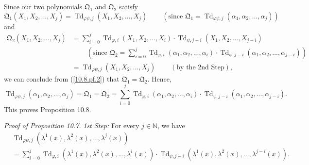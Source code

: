 \documentclass[numbers=enddot,12pt,final,onecolumn,notitlepage]{scrartcl}%
\begin{document}
Since our two polynomials $\mathfrak{Q}_{1}$ and $\mathfrak{Q}_{2}$ satisfy%
\[
\mathfrak{Q}_{1}\left(  X_{1},X_{2},...,X_{j}\right)  =\operatorname*{Td}%
\nolimits_{\varphi\psi,j}\left(  X_{1},X_{2},...,X_{j}\right)
\ \ \ \ \ \ \ \ \ \ \left(  \text{since }\mathfrak{Q}_{1}=\operatorname*{Td}%
\nolimits_{\varphi\psi,j}\left(  \alpha_{1},\alpha_{2},...,\alpha_{j}\right)
\right)
\]
and%
\begin{align*}
\mathfrak{Q}_{2}\left(  X_{1},X_{2},...,X_{j}\right)   &  =\sum_{i=0}%
^{j}\operatorname*{Td}\nolimits_{\varphi,i}\left(  X_{1},X_{2},...,X_{i}%
\right)  \cdot\operatorname*{Td}\nolimits_{\psi,j-i}\left(  X_{1}%
,X_{2},...,X_{j-i}\right) \\
&  \ \ \ \ \ \ \ \ \ \ \left(  \text{since }\mathfrak{Q}_{2}=\sum
\limits_{i=0}^{j}\operatorname*{Td}\nolimits_{\varphi,i}\left(  \alpha
_{1},\alpha_{2},...,\alpha_{i}\right)  \cdot\operatorname*{Td}\nolimits_{\psi
,j-i}\left(  \alpha_{1},\alpha_{2},...,\alpha_{j-i}\right)  \right) \\
&  =\operatorname*{Td}\nolimits_{\varphi\psi,j}\left(  X_{1},X_{2}%
,...,X_{j}\right)  \ \ \ \ \ \ \ \ \ \ \left(  \text{by the 2nd Step}\right)
,
\end{align*}
we can conclude from (\ref{10.8.pf.2}) that $\mathfrak{Q}_{1}=\mathfrak{Q}%
_{2}$. Hence,%
\[
\operatorname*{Td}\nolimits_{\varphi\psi,j}\left(  \alpha_{1},\alpha
_{2},...,\alpha_{j}\right)  =\mathfrak{Q}_{1}=\mathfrak{Q}_{2}=\sum
\limits_{i=0}^{j}\operatorname*{Td}\nolimits_{\varphi,i}\left(  \alpha
_{1},\alpha_{2},...,\alpha_{i}\right)  \cdot\operatorname*{Td}\nolimits_{\psi
,j-i}\left(  \alpha_{1},\alpha_{2},...,\alpha_{j-i}\right)  .
\]
This proves Proposition 10.8.

\textit{Proof of Proposition 10.7.} \textit{1st Step:} For every
$j\in\mathbb{N}$, we have%
\begin{align*}
&  \operatorname*{Td}\nolimits_{\varphi\psi,j}\left(  \lambda^{1}\left(
x\right)  ,\lambda^{2}\left(  x\right)  ,...,\lambda^{j}\left(  x\right)
\right) \\
&  =\sum\limits_{i=0}^{j}\operatorname*{Td}\nolimits_{\varphi,i}\left(
\lambda^{1}\left(  x\right)  ,\lambda^{2}\left(  x\right)  ,...,\lambda
^{i}\left(  x\right)  \right)  \cdot\operatorname*{Td}\nolimits_{\psi
,j-i}\left(  \lambda^{1}\left(  x\right)  ,\lambda^{2}\left(  x\right)
,...,\lambda^{j-i}\left(  x\right)  \right)  .
\end{align*}
\end{document}
